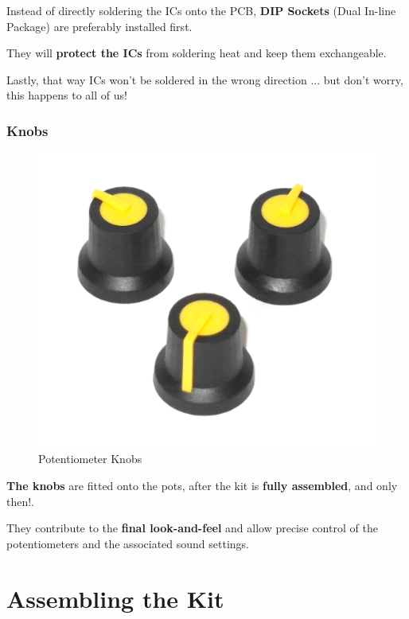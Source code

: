 \documentclass{scrartcl}
\begin{document}
Instead of directly soldering the ICs onto the PCB, \textbf{DIP Sockets} (Dual In-line Package) are preferably installed first.

They will \textbf{protect the ICs} from soldering heat and keep them exchangeable.

Lastly, that way ICs won't be soldered in the wrong direction ... but don't worry, this happens to all of us!

\subsubsection{Knobs}

\begin{figure}[!ht]
    \begin{center}
        \includegraphics[scale=0.20]{assets/zekit-knobs.jpg}
        \caption{Potentiometer Knobs}
    \end{center}
\end{figure}

\textbf{The knobs} are fitted onto the pots, after the kit is \textbf{fully assembled}, and only then!.

They contribute to the \textbf{final look-and-feel} and allow precise control of the potentiometers and the associated sound settings.

\pagebreak

\section{Assembling the Kit}
\end{document}
